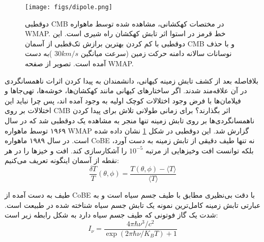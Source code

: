 \begin{figure}
	\begin{center}
		\texttt{[image: figs/dipole.png]}
	\end{center}
	\caption[
	دوقطبی CMB در مختصات کهکشانی، مشاهده شده توسط ماهواره WMAP. خط قرمز در استوا اثر تابش کهکشان راه شیری است. این دوقطبی با کم کردن بهترین برازش تک‌قطبی از آسمان CMB و با حذف نوسانات سالانه دامنه حرکت زمین (سرعت میانگین $30 km/s $ )به دست آمده است.
	تصویر از صفحه WMAP.   
	]	
	{ دوقطبی CMB در مختصات کهکشانی، مشاهده شده توسط ماهواره WMAP. خط قرمز در استوا اثر تابش کهکشان راه شیری است. این دوقطبی با کم کردن بهترین برازش تک‌قطبی از آسمان CMB و با حذف نوسانات سالانه دامنه حرکت زمین (سرعت میانگین $30 km/s $ )به دست آمده است.
		تصویر از صفحه WMAP.   
		\footnotemark
	}
	\label{fig:dipole}
\end{figure}

بلافاصله بعد از کشف تابش زمینه کیهانی، دانشمندان به پیدا کردن اثرات ناهمسانگردی در آن علاقه‌مند شدند. اگر ساختارهای کیهانی مانند کهکشان‌ها، خوشه‌ها، تهی‌جاها و فیلامان‌ها با فرض وجود اختلالات کوچک اولیه به وجود آمده اند، پس  چرا نباید این اختلالات بر روی CMB اثر بگذارند؟ برای زمانی طولانی تلاش برای پیدا کردن ناهمسانگردی‌ها بر روی تابش زمینه تنها منجر به مشاهده یک دوقطبی شد که در سال  ۱۹۶۹ توسط ماهواره WMAP
 گزارش شد.
\cite{conklin1969velocity}  
این دوقطبی در شکل 
\ref{fig:dipole}
نشان داده شده است. در سال ۱۹۸۹ ماهواره  CoBE
نه تنها طیف دقیقی از تابش زمینه به دست آورد، بلکه توانست افت وخیزهایی از مرتبه $10^{-5}$ را آشکارسازی کند. افت و خیزها را در هر نقطه از آسمان اینگونه تعریف می‌کنیم:
\begin{equation}
\frac{\delta T}{T}(\theta , \phi) = \frac{T(\theta , \phi) - \langle T \rangle}{\langle T \rangle}
\end{equation} 

طیف به دست آمده از CoBE با دقت بی‌نظیری مطابق با طیف جسم سیاه است و به عبارتی تابش زمینه کامل‌ترین نمونه یک تابش جسم سیاه شناخته شده در طبیعت است.  
شدت یک گاز فوتونی که طیف جسم سیاه دارد به شکل رابطه زیر است:
\cite{dodelson2003modern}
\begin{equation}
I_{\nu} = \frac{4 \pi \hbar \nu^3 /c^2}{\exp{(2\pi \hbar \nu /K_B T)} + 1}
\end{equation} 

